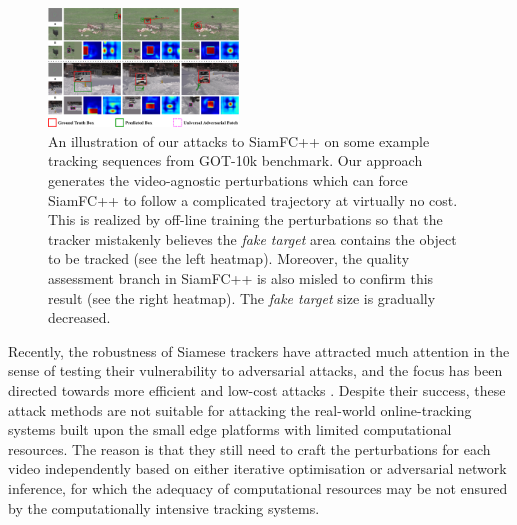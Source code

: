 \documentclass[journal]{IEEEtran}
\begin{document}
\begin{figure}[htbp]
  \centering
  \includegraphics[width=0.45\textwidth]{images/1_v8.pdf}
  \caption{An illustration of our attacks to SiamFC++ on some example tracking sequences from GOT-10k benchmark. Our approach generates the video-agnostic perturbations which can force SiamFC++ to follow a complicated trajectory at virtually no cost. This is realized by off-line training the perturbations so that the tracker mistakenly believes the \textit{fake target} area contains the object to be tracked (see the left heatmap). Moreover, the quality assessment branch in SiamFC++ is also misled to confirm this result (see the right heatmap). The \textit{fake target} size is gradually decreased.} 
  \label{fig:1}
\end{figure}

Recently, the robustness of Siamese trackers have attracted much attention in the sense of testing their vulnerability to adversarial attacks, and the focus has been directed towards more efficient and low-cost attacks \cite{TTP,FAN,SPARK}. Despite their success, these attack methods are not suitable for attacking the real-world online-tracking systems built upon the small edge platforms with limited computational resources. The reason is that they still need to craft the perturbations for each video independently based on either iterative optimisation or adversarial network inference, for which the adequacy of computational resources may be not ensured by the computationally intensive tracking systems. 
\end{document}
